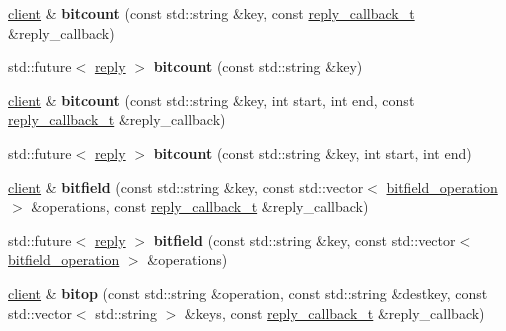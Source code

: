 \begin{DoxyCompactItemize}
\mbox{\hyperlink{classcpp__redis_1_1client}{client}} \& {\bfseries bitcount} (const std\+::string \&key, const \mbox{\hyperlink{classcpp__redis_1_1client_af7a65eb21aa25230bfbb0b0203c4fc04}{reply\+\_\+callback\+\_\+t}} \&reply\+\_\+callback)
\item 
\mbox{\label{classcpp__redis_1_1client_ac667b96661726874bc237c84de1ddd89}} 
std\+::future$<$ \mbox{\hyperlink{classcpp__redis_1_1reply}{reply}} $>$ {\bfseries bitcount} (const std\+::string \&key)
\item 
\mbox{\label{classcpp__redis_1_1client_ac631a06c8b69a2f1b4de3aabc19d68e2}} 
\mbox{\hyperlink{classcpp__redis_1_1client}{client}} \& {\bfseries bitcount} (const std\+::string \&key, int start, int end, const \mbox{\hyperlink{classcpp__redis_1_1client_af7a65eb21aa25230bfbb0b0203c4fc04}{reply\+\_\+callback\+\_\+t}} \&reply\+\_\+callback)
\item 
\mbox{\label{classcpp__redis_1_1client_af2d2dc1c19d735e84d8e2725fb98dbda}} 
std\+::future$<$ \mbox{\hyperlink{classcpp__redis_1_1reply}{reply}} $>$ {\bfseries bitcount} (const std\+::string \&key, int start, int end)
\item 
\mbox{\label{classcpp__redis_1_1client_aff0b03777d5c8bcb1f6a9bc9349b1a31}} 
\mbox{\hyperlink{classcpp__redis_1_1client}{client}} \& {\bfseries bitfield} (const std\+::string \&key, const std\+::vector$<$ \mbox{\hyperlink{structcpp__redis_1_1client_1_1bitfield__operation}{bitfield\+\_\+operation}} $>$ \&operations, const \mbox{\hyperlink{classcpp__redis_1_1client_af7a65eb21aa25230bfbb0b0203c4fc04}{reply\+\_\+callback\+\_\+t}} \&reply\+\_\+callback)
\item 
\mbox{\label{classcpp__redis_1_1client_a59d901d5bc9137f9bee0cd399fc07d2a}} 
std\+::future$<$ \mbox{\hyperlink{classcpp__redis_1_1reply}{reply}} $>$ {\bfseries bitfield} (const std\+::string \&key, const std\+::vector$<$ \mbox{\hyperlink{structcpp__redis_1_1client_1_1bitfield__operation}{bitfield\+\_\+operation}} $>$ \&operations)
\item 
\mbox{\label{classcpp__redis_1_1client_a9289b0f474073f59509b565d93c69506}} 
\mbox{\hyperlink{classcpp__redis_1_1client}{client}} \& {\bfseries bitop} (const std\+::string \&operation, const std\+::string \&destkey, const std\+::vector$<$ std\+::string $>$ \&keys, const \mbox{\hyperlink{classcpp__redis_1_1client_af7a65eb21aa25230bfbb0b0203c4fc04}{reply\+\_\+callback\+\_\+t}} \&reply\+\_\+callback)

\end{DoxyCompactItemize}
